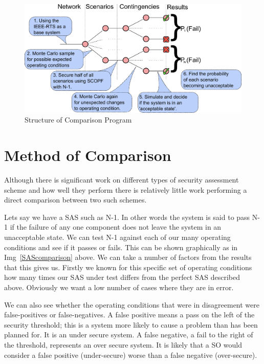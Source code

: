 \documentclass[a4paper,oneside,12pt]{report}
\begin{document}
  \begin{figure}
    \begin{center}
      \includegraphics[scale=0.8]{overview.png}
      \caption{Structure of Comparison Program}
      \label{figprograms}
    \end{center}
  \end{figure}






\section{Method of Comparison}\label{lbl_sec_comparison}

Although there is significant work on different types of security assessment scheme and how well they perform there is relatively little work performing a direct comparison between two such schemes.

Lets say we have a SAS such as N-1. In other words the system is said to pass N-1 if the failure of any one component does not leave the system in an unacceptable state. We can test N-1 against each of our many operating conditions and see if it passes or fails. This can be shown graphically as in Img~\ref{SAScomparison} above. We can take a number of factors from the results that this gives us. Firstly we known for this specific set of operating conditions how many times our SAS under test differs from the perfect SAS described above. Obviously we want a low number of cases where they are in error.

We can also see whether the operating conditions that were in disagreement were false-positives or false-negatives. A false positive means a pass on the left of the security threshold; this is a system more likely to cause a problem than has been planned for. It is an under secure system. A false negative, a fail to the right of the threshold, represents an over secure system. It is likely that a SO would consider a false positive (under-secure) worse than a false negative (over-secure).
\end{document}
